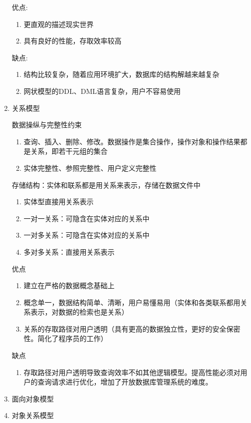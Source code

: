 \documentclass{article}
\begin{document}
\begin{enumerate}
    优点:
    \begin{enumerate}
        \item 更直观的描述现实世界
        \item 具有良好的性能，存取效率较高
    \end{enumerate}

    缺点:
    \begin{enumerate}
        \item 结构比较复杂，随着应用环境扩大，数据库的结构解越来越复杂
        \item 网状模型的DDL、DML语言复杂，用户不容易使用
    \end{enumerate}

    \item 关系模型

    数据操纵与完整性约束
    \begin{enumerate}
        \item 查询、插入、删除、修改。数据操作是集合操作，操作对象和操作结果都是关系，即若干元组的集合
        \item 实体完整性、参照完整性、用户定义完整性
    \end{enumerate}

    存储结构：实体和联系都是用关系来表示，存储在数据文件中
    \begin{enumerate}
        \item 实体型直接用关系表示
        \item 一对一关系：可隐含在实体对应的关系中
        \item 一对多关系：可隐含在实体对应的关系中
        \item 多对多关系：直接用关系表示
    \end{enumerate}

    优点
    \begin{enumerate}
        \item 建立在严格的数据概念基础上
        \item 概念单一，数据结构简单、清晰，用户易懂易用（实体和各类联系都用关系表示，对数据的检索也是关系）
        \item 关系的存取路径对用户透明（具有更高的数据独立性，更好的安全保密性。简化了程序员的工作）
    \end{enumerate}

    缺点
    \begin{enumerate}
        \item 存取路径对用户透明导致查询效率不如其他逻辑模型。提高性能必须对用户的查询请求进行优化，增加了开放数据库管理系统的难度。
    \end{enumerate}
    \item 面向对象模型
    \item 对象关系模型
\end{enumerate}
\end{document}
